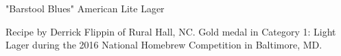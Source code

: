 \stylesection{\styleamericanlightlager}

\begin{recipe}{"Barstool Blues" American Lite Lager}

\begin{aboutblock}
Recipe by Derrick Flippin of Rural Hall, NC. Gold medal in Category 1: Light Lager
during the 2016 National Homebrew Competition in Baltimore, MD.
\sourceaha
\end{aboutblock}


\begin{methodandtiming}

\begin{mashsteps}

\end{mashsteps}

\begin{fermentationsteps}
\end{fermentationsteps}

\end{methodandtiming}

\recipebreak

\begin{ingredientsblock}

\begin{malts}
\end{malts}

\begin{hops}
\end{hops}


\end{ingredientsblock}

\end{recipe}

